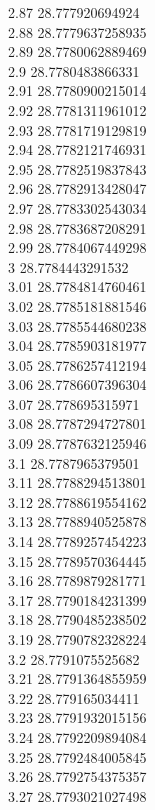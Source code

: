 {2.87	28.777920694924\\
2.88	28.7779637258935\\
2.89	28.7780062889469\\
2.9	28.7780483866331\\
2.91	28.7780900215014\\
2.92	28.7781311961012\\
2.93	28.7781719129819\\
2.94	28.7782121746931\\
2.95	28.7782519837843\\
2.96	28.7782913428047\\
2.97	28.7783302543034\\
2.98	28.7783687208291\\
2.99	28.7784067449298\\
3	28.7784443291532\\
3.01	28.7784814760461\\
3.02	28.7785181881546\\
3.03	28.7785544680238\\
3.04	28.7785903181977\\
3.05	28.7786257412194\\
3.06	28.7786607396304\\
3.07	28.778695315971\\
3.08	28.7787294727801\\
3.09	28.7787632125946\\
3.1	28.7787965379501\\
3.11	28.7788294513801\\
3.12	28.7788619554162\\
3.13	28.7788940525878\\
3.14	28.7789257454223\\
3.15	28.7789570364445\\
3.16	28.7789879281771\\
3.17	28.7790184231399\\
3.18	28.7790485238502\\
3.19	28.7790782328224\\
3.2	28.7791075525682\\
3.21	28.7791364855959\\
3.22	28.779165034411\\
3.23	28.7791932015156\\
3.24	28.7792209894084\\
3.25	28.7792484005845\\
3.26	28.7792754375357\\
3.27	28.7793021027498\\
}

